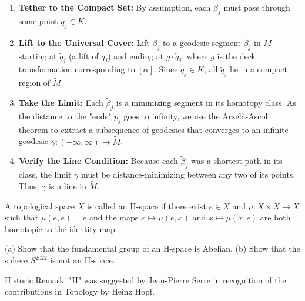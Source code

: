 \begin{solution}
\begin{enumerate}
    \item \textbf{Tether to the Compact Set:}
    By assumption, each $\beta_j$ must pass through some point $q_j \in K$.
    
    \item \textbf{Lift to the Universal Cover:}
    Lift $\beta_j$ to a geodesic segment $\tilde{\beta}_j$ in $\widetilde{M}$ starting at $\tilde{q}_j$ (a lift of $q_j$) and ending at $g \cdot \tilde{q}_j$, where $g$ is the deck transformation corresponding to $[\alpha]$.
    Since $q_j \in K$, all $\tilde{q}_j$ lie in a compact region of $\widetilde{M}$.
    
    \item \textbf{Take the Limit:}
    Each $\tilde{\beta}_j$ is a minimizing segment in its homotopy class. As the distance to the "ends" $p_j$ goes to infinity, we use the Arzelà-Ascoli theorem to extract a subsequence of geodesics that converges to an infinite geodesic $\gamma: (-\infty, \infty) \to \widetilde{M}$.
    
    \item \textbf{Verify the Line Condition:}
    Because each $\tilde{\beta}_j$ was a shortest path in its class, the limit $\gamma$ must be distance-minimizing between any two of its points.
    Thus, $\gamma$ is a line in $\widetilde{M}$.
\end{enumerate}
\end{solution}

\begin{exercise}
\label{geometry:2022:5}
A topological space $X$ is called an H-space if there exist $e \in X$ and $\mu : X \times X \to X$ such that $\mu(e, e) = e$ and the maps $x \mapsto \mu(e, x)$ and $x \mapsto \mu(x, e)$ are both homotopic to the identity map.

(a) Show that the fundamental group of an H-space is Abelian.
(b) Show that the sphere $S^{2022}$ is not an H-space.

Historic Remark: "H" was suggested by Jean-Pierre Serre in recognition of the contributions in Topology by Heinz Hopf.
\end{exercise}

